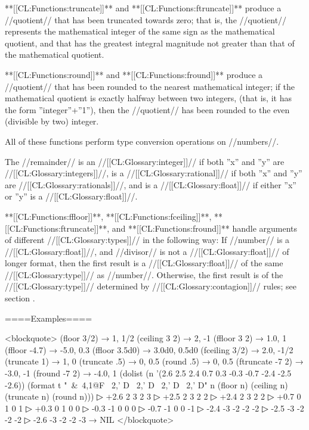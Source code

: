 
**[[CL:Functions:truncate]]** and **[[CL:Functions:ftruncate]]** produce a //quotient// that has been truncated towards zero; that is, the //quotient// represents the mathematical integer of the same sign as the mathematical quotient, and that has the greatest integral magnitude not greater than that of the mathematical quotient.


**[[CL:Functions:round]]** and **[[CL:Functions:fround]]** produce a //quotient// that has been rounded to the nearest mathematical integer; if the mathematical quotient is exactly halfway between two integers, (that is, it has the form ''integer''+''1''), then the //quotient// has been rounded to the even (divisible by two) integer.

\endlist

All of these functions perform type conversion operations on //numbers//.

The //remainder// is an //[[CL:Glossary:integer]]// if both ''x'' and ''y'' are //[[CL:Glossary:integers]]//, is a //[[CL:Glossary:rational]]// if both ''x'' and ''y'' are //[[CL:Glossary:rationals]]//, and is a //[[CL:Glossary:float]]// if either ''x'' or ''y'' is a //[[CL:Glossary:float]]//.

**[[CL:Functions:ffloor]]**, **[[CL:Functions:fceiling]]**, **[[CL:Functions:ftruncate]]**, and **[[CL:Functions:fround]]** handle arguments of different //[[CL:Glossary:types]]// in the following way: If //number// is a //[[CL:Glossary:float]]//, and //divisor// is not a //[[CL:Glossary:float]]// of longer format, then the first result is a //[[CL:Glossary:float]]// of the same //[[CL:Glossary:type]]// as //number//. Otherwise, the first result is of the //[[CL:Glossary:type]]// determined by //[[CL:Glossary:contagion]]// rules; see section {\secref\NumericContagionRules}.

====Examples====

<blockquote> (floor 3/2) → 1, 1/2 (ceiling 3 2) → 2, -1 (ffloor 3 2) → 1.0, 1 (ffloor -4.7) → -5.0, 0.3 (ffloor 3.5d0) → 3.0d0, 0.5d0 (fceiling 3/2) → 2.0, -1/2 (truncate 1) → 1, 0 (truncate .5) → 0, 0.5 (round .5) → 0, 0.5 (ftruncate -7 2) → -3.0, -1 (fround -7 2) → -4.0, 1 (dolist (n '(2.6 2.5 2.4 0.7 0.3 -0.3 -0.7 -2.4 -2.5 -2.6)) (format t "~&~4,1@F ~2,' D ~2,' D ~2,' D ~2,' D" n (floor n) (ceiling n) (truncate n) (round n)))
▷ +2.6 2 3 2 3
▷ +2.5 2 3 2 2
▷ +2.4 2 3 2 2
▷ +0.7 0 1 0 1
▷ +0.3 0 1 0 0
▷ -0.3 -1 0 0 0
▷ -0.7 -1 0 0 -1
▷ -2.4 -3 -2 -2 -2
▷ -2.5 -3 -2 -2 -2
▷ -2.6 -3 -2 -2 -3 → NIL </blockquote>

